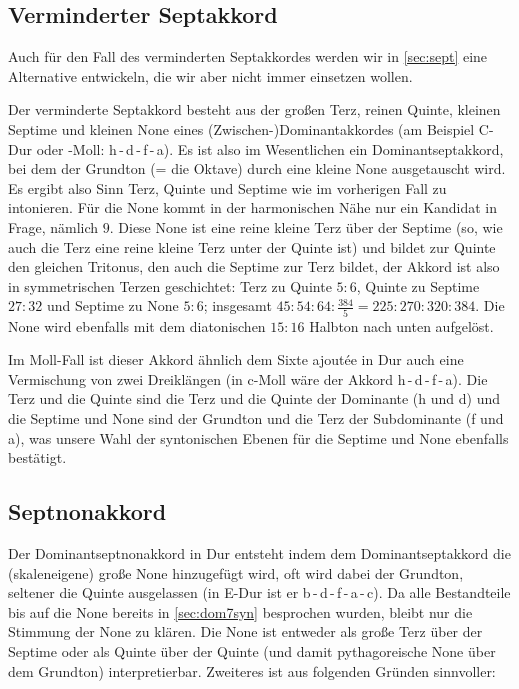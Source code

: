 \subsection{Verminderter Septakkord}
\label{sec:dim7syn}

Auch für den Fall des verminderten Septakkordes werden wir in \cref{sec:sept}
eine Alternative entwickeln, die wir aber nicht immer einsetzen wollen.

Der verminderte Septakkord besteht aus der großen Terz, reinen Quinte, kleinen
Septime und kleinen None eines (Zwischen-)Dominantakkordes (am Beispiel C-Dur
oder -Moll: h\,-\,d\,-\,f\,-\,\flat a). Es ist also im Wesentlichen ein
Dominantseptakkord, bei dem der Grundton (= die Oktave) durch eine kleine
None ausgetauscht wird. Es ergibt also Sinn Terz, Quinte und Septime wie im
vorherigen Fall zu intonieren. Für die None kommt in der harmonischen Nähe nur
ein Kandidat in Frage, nämlich \flatp $9$. Diese None ist eine reine kleine Terz
über der Septime (so, wie auch die Terz eine reine kleine Terz unter der Quinte
ist) und bildet zur Quinte den gleichen Tritonus, den auch die Septime zur Terz
bildet, der Akkord ist also in symmetrischen Terzen geschichtet: Terz zu Quinte
$5:6$, Quinte zu Septime $27:32$ und Septime zu None $5:6$; insgesamt
$45:54:64:\frac{384}5 = 225:270:320:384$. Die None wird ebenfalls mit dem
diatonischen $15:16$ Halbton nach unten aufgelöst.

Im Moll-Fall ist dieser Akkord ähnlich dem Sixte ajoutée in Dur auch eine
Vermischung von zwei Dreiklängen (in c-Moll wäre der Akkord \naturalm
h\,-\,d\,-\,f\,-\,\flatp a). Die Terz und die Quinte sind die Terz und die
Quinte der Dominante (\naturalm h und d) und die Septime und None sind der
Grundton und die Terz der Subdominante (f und \flatp a), was unsere Wahl der
syntonischen Ebenen für die Septime und None ebenfalls bestätigt.

\subsection{Septnonakkord}

Der Dominantseptnonakkord in Dur entsteht indem dem Dominantseptakkord die
(skaleneigene) große None hinzugefügt wird, oft wird dabei der Grundton,
seltener die Quinte ausgelassen (in \flat E-Dur ist er \flat
b\,-\,d\,-\,f\,-\,\flat a\,-\,c).  Da alle Bestandteile bis auf die None bereits
in \cref{sec:dom7syn} besprochen wurden, bleibt nur die Stimmung der None zu
klären.  Die None ist entweder als große Terz über der Septime oder als Quinte
über der Quinte (und damit pythagoreische None über dem Grundton)
interpretierbar.  Zweiteres ist aus folgenden Gründen sinnvoller:

